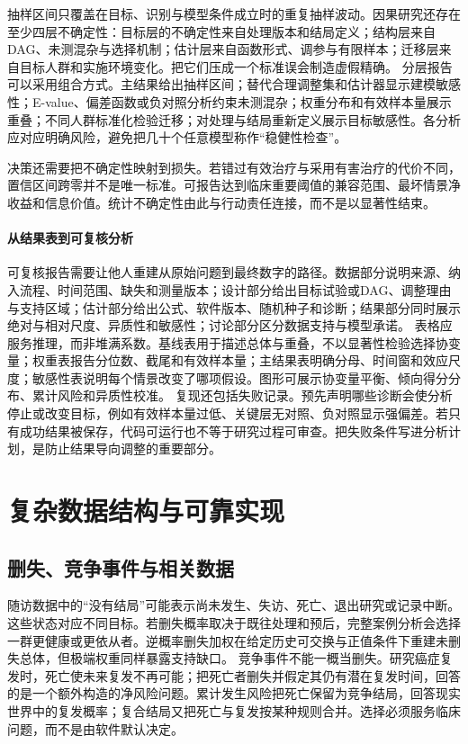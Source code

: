 抽样区间只覆盖在目标、识别与模型条件成立时的重复抽样波动。因果研究还存在至少四层不确定性：目标层的不确定性来自处理版本和结局定义；结构层来自DAG、未测混杂与选择机制；估计层来自函数形式、调参与有限样本；迁移层来自目标人群和实施环境变化。把它们压成一个标准误会制造虚假精确。
分层报告可以采用组合方式。主结果给出抽样区间；替代合理调整集和估计器显示建模敏感性；E-value、偏差函数或负对照分析约束未测混杂；权重分布和有效样本量展示重叠；不同人群标准化检验迁移；对处理与结局重新定义展示目标敏感性。各分析应对应明确风险，避免把几十个任意模型称作“稳健性检查”。

决策还需要把不确定性映射到损失。若错过有效治疗与采用有害治疗的代价不同，置信区间跨零并不是唯一标准。可报告达到临床重要阈值的兼容范围、最坏情景净收益和信息价值。统计不确定性由此与行动责任连接，而不是以显著性结束。

\paragraph{从结果表到可复核分析}

可复核报告需要让他人重建从原始问题到最终数字的路径。数据部分说明来源、纳入流程、时间范围、缺失和测量版本；设计部分给出目标试验或DAG、调整理由与支持区域；估计部分给出公式、软件版本、随机种子和诊断；结果部分同时展示绝对与相对尺度、异质性和敏感性；讨论部分区分数据支持与模型承诺。
表格应服务推理，而非堆满系数。基线表用于描述总体与重叠，不以显著性检验选择协变量；权重表报告分位数、截尾和有效样本量；主结果表明确分母、时间窗和效应尺度；敏感性表说明每个情景改变了哪项假设。图形可展示协变量平衡、倾向得分分布、累计风险和异质性校准。
复现还包括失败记录。预先声明哪些诊断会使分析停止或改变目标，例如有效样本量过低、关键层无对照、负对照显示强偏差。若只有成功结果被保存，代码可运行也不等于研究过程可审查。把失败条件写进分析计划，是防止结果导向调整的重要部分。

\section{复杂数据结构与可靠实现}

\subsection{删失、竞争事件与相关数据}

随访数据中的“没有结局”可能表示尚未发生、失访、死亡、退出研究或记录中断。这些状态对应不同目标。若删失概率取决于既往处理和预后，完整案例分析会选择一群更健康或更依从者。逆概率删失加权在给定历史可交换与正值条件下重建未删失总体，但极端权重同样暴露支持缺口。
竞争事件不能一概当删失。研究癌症复发时，死亡使未来复发不再可能；把死亡者删失并假定其仍有潜在复发时间，回答的是一个额外构造的净风险问题。累计发生风险把死亡保留为竞争结局，回答现实世界中的复发概率；复合结局又把死亡与复发按某种规则合并。选择必须服务临床问题，而不是由软件默认决定。

